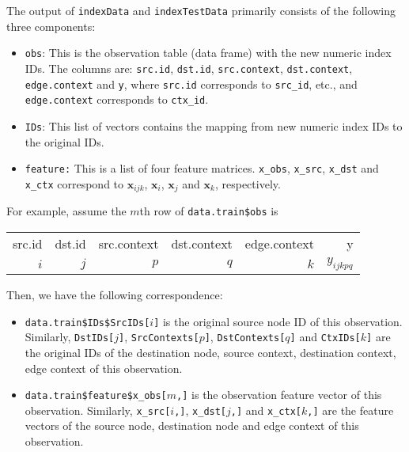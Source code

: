 \documentclass[10pt]{article}
\begin{document}
The output of {\tt indexData} and {\tt indexTestData} primarily consists of the following three components:
\begin{itemize}
\item {\tt obs}: This is the observation table (data frame) with the new numeric index IDs.  The columns are: {\tt src.id}, {\tt dst.id}, {\tt src.context}, {\tt dst.context}, {\tt edge.context} and {\tt y}, where {\tt src.id} corresponds to {\tt src\_id}, etc., and {\tt edge.context} corresponds to {\tt ctx\_id}.
\item {\tt IDs}: This list of vectors contains the mapping from new numeric index IDs to the original IDs.
\item {\tt feature:} This is a list of four feature matrices.  {\tt x\_obs}, {\tt x\_src}, {\tt x\_dst} and {\tt x\_ctx} correspond to $\bm{x}_{ijk}$, $\bm{x}_{i}$, $\bm{x}_{j}$ and $\bm{x}_{k}$, respectively.
\end{itemize}
For example, assume the $m$th row of {\tt data.train\$obs} is \\
{\small\begin{center}\begin{tabular}{r r r r r r}
src.id & dst.id & src.context & dst.context & edge.context & y \\
   $i$ &    $j$ &         $p$ &         $q$ &          $k$ & $y_{ijkpq}$ \\
\end{tabular}\end{center}}
\noindent Then, we have the following correspondence:
\begin{itemize}
\item {\tt data.train\$IDs\$SrcIDs[$i$]} is the original source node ID of this observation.  Similarly, {\tt DstIDs[$j$]}, {\tt SrcContexts[$p$]}, {\tt DstContexts[$q$]} and {\tt CtxIDs[$k$]} are the original IDs of the destination node, source context, destination context, edge context of this observation.
\item {\tt data.train\$feature\$x\_obs[$m$,]} is the observation feature vector of this observation.  Similarly, {\tt x\_src[$i$,]}, {\tt x\_dst[$j$,]} and {\tt x\_ctx[$k$,]} are the feature vectors of the source node, destination node and edge context of this observation.
\end{itemize}
\end{document}
